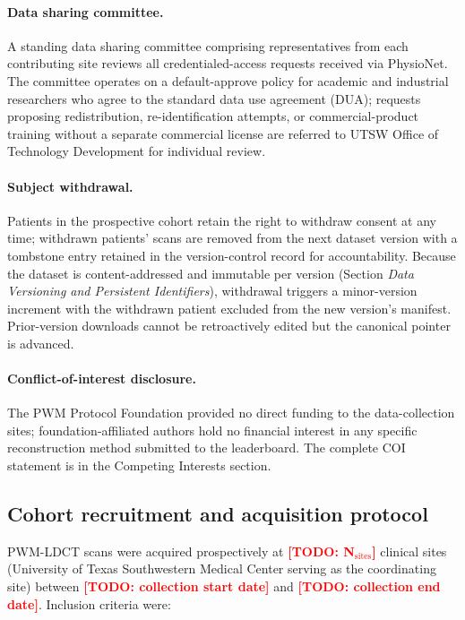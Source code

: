 \documentclass[twoside,11pt]{article}
\newcommand{\todo}[1]{\textcolor{red}{\textbf{[TODO: #1]}}}
\begin{document}
\paragraph{Data sharing committee.} A standing data sharing committee comprising representatives from each contributing site reviews all credentialed-access requests received via PhysioNet. The committee operates on a default-approve policy for academic and industrial researchers who agree to the standard data use agreement (DUA); requests proposing redistribution, re-identification attempts, or commercial-product training without a separate commercial license are referred to UTSW Office of Technology Development for individual review.

\paragraph{Subject withdrawal.} Patients in the prospective cohort retain the right to withdraw consent at any time; withdrawn patients' scans are removed from the next dataset version with a tombstone entry retained in the version-control record for accountability. Because the dataset is content-addressed and immutable per version (Section \textit{Data Versioning and Persistent Identifiers}), withdrawal triggers a minor-version increment with the withdrawn patient excluded from the new version's manifest. Prior-version downloads cannot be retroactively edited but the canonical pointer is advanced.

\paragraph{Conflict-of-interest disclosure.} The PWM Protocol Foundation provided no direct funding to the data-collection sites; foundation-affiliated authors hold no financial interest in any specific reconstruction method submitted to the leaderboard. The complete COI statement is in the Competing Interests section.

\subsection*{Cohort recruitment and acquisition protocol}

PWM-LDCT scans were acquired prospectively at \todo{N$_{\textrm{sites}}$} clinical sites (University of Texas Southwestern Medical Center serving as the coordinating site) between \todo{collection start date} and \todo{collection end date}. Inclusion criteria were:
\end{document}
